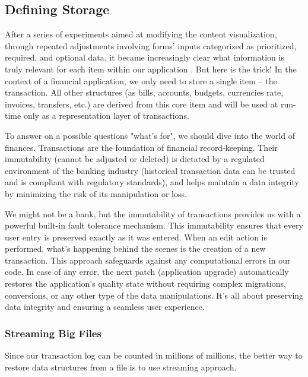 
\subsection{Defining Storage}

After a series of experiments aimed at modifying the content visualization, through repeated adjustments involving 
forms' inputs categorized as prioritized, required, and optional data, it became increasingly clear what information is 
truly relevant for each item within our application . But here is the trick! In the context of a financial 
application, we only need to store a single item -- the transaction. All other structures (as bills, accounts, 
budgets, currencies rate, invoices, transfers, etc.) are derived from this core item and will be used at run-time only
as a representation layer of transactions.

To answer on a possible questions "what's for", we should dive into the world of finances. Transactions are the 
foundation of financial record-keeping. Their immutability (cannot be adjusted or deleted) is dictated by a regulated 
environment of the banking industry (historical transaction data can be trusted and is compliant with regulatory 
standards), and helps maintain a data integrity by minimizing the risk of its manipulation or loss.

We might not be a bank, but the immutability of transactions provides us with a powerful built-in fault tolerance 
mechanism. This immutability ensures that every user entry is preserved exactly as it was entered. When an edit action 
is performed, what's happening behind the scenes is the creation of a new transaction. This approach safeguards against 
any computational errors in our code. In case of any error, the next patch (application upgrade) automatically 
restores the application's quality state without requiring complex migrations, conversions, or any other type of 
the data manipulations. It's all about preserving data integrity and ensuring a seamless user experience.


\subsubsection{Streaming Big Files}

Since our transaction log can be counted in millions of millions, the better way to restore data structures from a file
is to use streaming approach.

